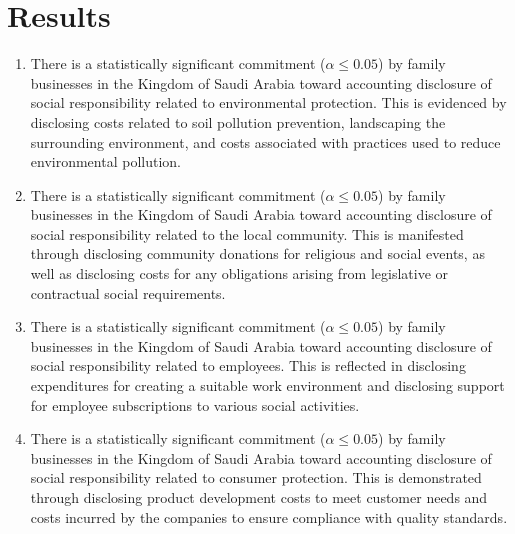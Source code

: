 \documentclass{NSP1}
\begin{document}
\section{Results}
\begin{enumerate}
\item There is a statistically significant commitment ($\alpha \le 0.05$) by family businesses in the Kingdom of Saudi Arabia toward accounting disclosure of social responsibility related to environmental protection. This is evidenced by disclosing costs related to soil pollution prevention, landscaping the surrounding environment, and costs associated with practices used to reduce environmental pollution.
\item There is a statistically significant commitment ($\alpha \le 0.05$) by family businesses in the Kingdom of Saudi Arabia toward accounting disclosure of social responsibility related to the local community. This is manifested through disclosing community donations for religious and social events, as well as disclosing costs for any obligations arising from legislative or contractual social requirements.
\item There is a statistically significant commitment ($\alpha \le 0.05$) by family businesses in the Kingdom of Saudi Arabia toward accounting disclosure of social responsibility related to employees. This is reflected in disclosing expenditures for creating a suitable work environment and disclosing support for employee subscriptions to various social activities.
\item There is a statistically significant commitment ($\alpha \le 0.05$) by family businesses in the Kingdom of Saudi Arabia toward accounting disclosure of social responsibility related to consumer protection. This is demonstrated through disclosing product development costs to meet customer needs and costs incurred by the companies to ensure compliance with quality standards.
\end{enumerate}
\end{document}
